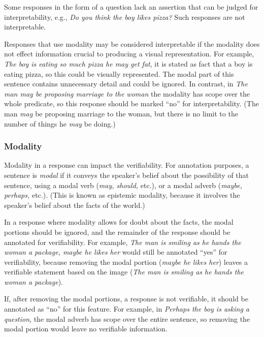 \documentclass[12pt,notitlepage]{article}
\begin{document}
Some responses in the form of a question lack an assertion that can be judged for interpretability, e.g., \textit{Do you think the boy likes pizza?} Such responses are not interpretable.

Responses that use modality may be considered interpretable if the modality does not effect information crucial to producing a visual representation. For example, \textit{The boy is eating so much pizza he may get fat}, it is stated as fact that a boy is eating pizza, so this could be visually represented. The modal part of this sentence contains unnecessary detail and could be ignored. In contrast, in \textit{The man may be proposing marriage to the woman} the modality has scope over the whole predicate, so this response should be marked ``no'' for interpretability. (The man \textit{may} be proposing marriage to the woman, but there is no limit to the number of things he \textit{may} be doing.)

\subsubsection{Modality} Modality in a response can impact the verifiability. For annotation purposes, a sentence is \textit{modal} if it conveys the speaker's belief about the possibility of that sentence, using a modal verb (\textit{may, should,} etc.), or a modal adverb (\textit{maybe, perhaps,} etc.). (This is known as epistemic modality, because it involves the speaker's belief about the facts of the world.)

In a response where modality allows for doubt about the facts, the modal portions should be ignored, and the remainder of the response should be annotated for verifiability. For example, \textit{The man is smiling as he hands the woman a package, maybe he likes her} would still be annotated ``yes'' for verifiability, because removing the modal portion (\textit{maybe he likes her}) leaves a verifiable statement based on the image (\textit{The man is smiling as he hands the woman a package}).

If, after removing the modal portions, a response is not verifiable, it should be annotated as ``no'' for this feature. For example, in \textit{Perhaps the boy is asking a question}, the modal adverb has scope over the entire sentence, so removing the modal portion would leave no verifiable information.
\end{document}
